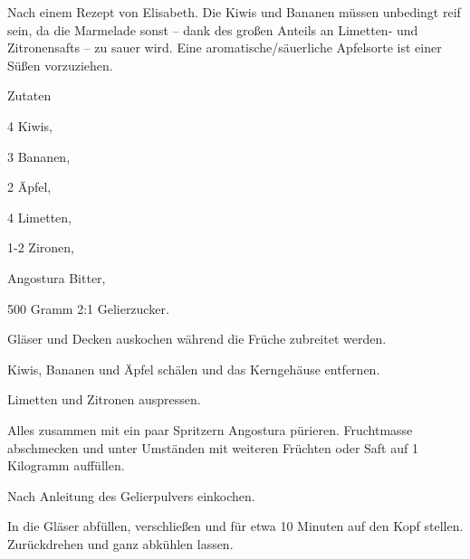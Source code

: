 \startsection[title={AKiBa-Marmelade},reference=akibamarmelade]

Nach einem Rezept von Elisabeth. Die Kiwis und Bananen müssen unbedingt
reif sein, da die Marmelade sonst -- dank des großen Anteils an
Limetten- und Zitronensafts -- zu sauer wird. Eine
aromatische/säuerliche Apfelsorte ist einer Süßen vorzuziehen.

\startitemize
\item Zutaten
      \startitemize
      \item 4 Kiwis,
      \item 3 Bananen,
      \item 2 Äpfel,
      \item 4 Limetten,
      \item 1-2 Zironen,
      \item Angostura Bitter,
      \item 500 Gramm 2:1 Gelierzucker.
      \stopitemize

\item Gläser und Decken auskochen während die Früche zubreitet werden.
\item Kiwis, Bananen und Äpfel schälen und das Kerngehäuse entfernen.
\item Limetten und Zitronen auspressen.
\item Alles zusammen mit ein paar Spritzern Angostura pürieren.
      Fruchtmasse abschmecken und unter Umständen mit weiteren Früchten
      oder Saft auf 1 Kilogramm auffüllen.
\item Nach Anleitung des Gelierpulvers einkochen.
\item In die Gläser abfüllen, verschließen und für etwa 10 Minuten
      auf den Kopf stellen. Zurückdrehen und ganz abkühlen lassen.
\stopitemize

\stopsection
